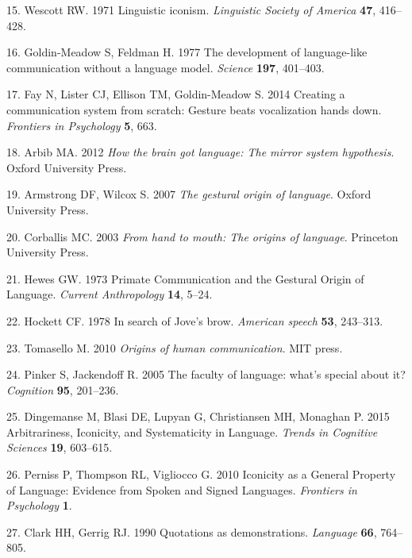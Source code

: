 \documentclass[english,floatsintext,man]{apa6}
\theoremstyle{definition}
\theoremstyle{definition}
\theoremstyle{definition}
\theoremstyle{remark}
\begin{document}
\leavevmode\hypertarget{ref-Wescott:1971to}{}%
15. Wescott RW. 1971 Linguistic iconism. \emph{Linguistic Society of
America} \textbf{47}, 416--428.

\leavevmode\hypertarget{ref-GoldinMeadow:1977gz}{}%
16. Goldin-Meadow S, Feldman H. 1977 The development of language-like
communication without a language model. \emph{Science} \textbf{197},
401--403.

\leavevmode\hypertarget{ref-Fay:2014cw}{}%
17. Fay N, Lister CJ, Ellison TM, Goldin-Meadow S. 2014 Creating a
communication system from scratch: Gesture beats vocalization hands
down. \emph{Frontiers in Psychology} \textbf{5}, 663.

\leavevmode\hypertarget{ref-Arbib:2012htb}{}%
18. Arbib MA. 2012 \emph{How the brain got language: The mirror system
hypothesis}. Oxford University Press.

\leavevmode\hypertarget{ref-Armstrong:2007go}{}%
19. Armstrong DF, Wilcox S. 2007 \emph{The gestural origin of language}.
Oxford University Press.

\leavevmode\hypertarget{ref-Corballis:2003ha}{}%
20. Corballis MC. 2003 \emph{From hand to mouth: The origins of
language}. Princeton University Press.

\leavevmode\hypertarget{ref-Hewes:1973vr}{}%
21. Hewes GW. 1973 Primate Communication and the Gestural Origin of
Language. \emph{Current Anthropology} \textbf{14}, 5--24.

\leavevmode\hypertarget{ref-Hockett:1978se}{}%
22. Hockett CF. 1978 In search of Jove's brow. \emph{American speech}
\textbf{53}, 243--313.

\leavevmode\hypertarget{ref-Tomasello:2010or}{}%
23. Tomasello M. 2010 \emph{Origins of human communication}. MIT press.

\leavevmode\hypertarget{ref-Pinker:2005cv}{}%
24. Pinker S, Jackendoff R. 2005 The faculty of language: what's special
about it? \emph{Cognition} \textbf{95}, 201--236.

\leavevmode\hypertarget{ref-Dingemanse:2015cu}{}%
25. Dingemanse M, Blasi DE, Lupyan G, Christiansen MH, Monaghan P. 2015
Arbitrariness, Iconicity, and Systematicity in Language. \emph{Trends in
Cognitive Sciences} \textbf{19}, 603--615.

\leavevmode\hypertarget{ref-Perniss:2010fb}{}%
26. Perniss P, Thompson RL, Vigliocco G. 2010 Iconicity as a General
Property of Language: Evidence from Spoken and Signed Languages.
\emph{Frontiers in Psychology} \textbf{1}.

\leavevmode\hypertarget{ref-Clark:1990cl}{}%
27. Clark HH, Gerrig RJ. 1990 Quotations as demonstrations.
\emph{Language} \textbf{66}, 764--805.
\end{document}
